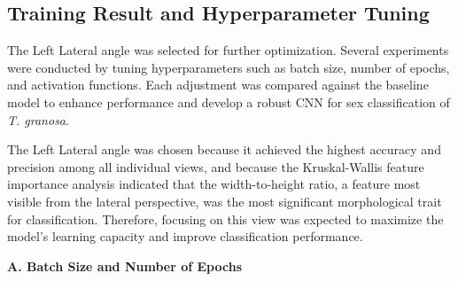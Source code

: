 \subsection{Training Result and Hyperparameter Tuning}
The Left Lateral angle was selected for further optimization. Several experiments were conducted by tuning hyperparameters such as batch size, number of epochs, and activation functions. Each adjustment was compared against the baseline model to enhance performance and develop a robust CNN for sex classification of \textit{T. granosa}.

The Left Lateral angle was chosen because it achieved the highest accuracy and precision among all individual views, and because the Kruskal-Wallis feature importance analysis indicated that the width-to-height ratio, a feature most visible from the lateral perspective, was the most significant morphological trait for classification. Therefore, focusing on this view was expected to maximize the model's learning capacity and improve classification performance.

\noindent\textbf{A. Batch Size and Number of Epochs}

\begin{table}[H]
	\centering
	\caption{Effect of batch size and epoch values on CNN model performance.}
	\label{tab:batchsize-epoch}
\end{table}

